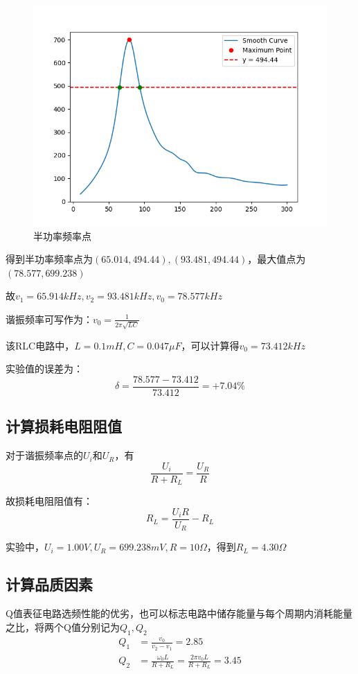 \documentclass{article}
\begin{document}
\begin{figure}[htbp]
    \centering
    \includegraphics[width=1.0\textwidth]{1-3.png}
    \caption{半功率频率点}
\end{figure}

得到半功率频率点为$(65.014, 494.44), (93.481, 494.44)$，最大值点为$(78.577, 699.238)$

故$v_1 = 65.914 kHz, v_2 = 93.481 kHz, v_0 = 78.577 kHz$

谐振频率可写作为：$v_0 = \frac{1}{2\pi \sqrt{LC}}$

该RLC电路中，$L = 0.1 mH, C = 0.047\mu F$，可以计算得$v_0 = 73.412 kHz$

实验值的误差为：
\begin{equation*}
    \delta = \frac{78.577 - 73.412}{73.412} = +7.04\%
\end{equation*}

\subsection{计算损耗电阻阻值}
对于谐振频率点的$U_i$和$U_R$，有
\begin{equation*}
    \frac{U_i}{R + R_L} = \frac{U_R}{R}
\end{equation*}

故损耗电阻阻值有：
\begin{equation*}
    R_L = \frac{U_i R}{U_R} - R_L
\end{equation*}

实验中，$U_i = 1.00V, U_R = 699.238 mV, R = 10\Omega$，得到$R_L = 4.30 \Omega$

\subsection{计算品质因素}
Q值表征电路选频性能的优劣，也可以标志电路中储存能量与每个周期内消耗能量之比，将两个Q值分别记为$Q_1, Q_2$
\begin{align*}
    Q_1 &= \frac{v_0}{v_2 - v_1} = 2.85 \\
    Q_2 &= \frac{\omega_0 L}{R + R_L} = \frac{2\pi v_0 L}{R + R_L} = 3.45
\end{align*}
\end{document}
